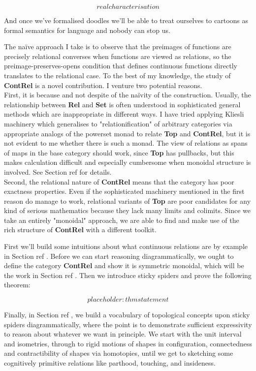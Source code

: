 \[real characterisation\]

And once we've formalised doodles we'll be able to treat ourselves to cartoons as formal semantics for language and nobody can stop us.


The na\"{i}ve approach I take is to observe that the preimages of functions are precisely relational converses when functions are viewed as relations, so the preimage-preserves-opens condition that defines continuous functions directly translates to the relational case. To the best of my knowledge, the study of \textbf{ContRel} is a novel contribution. I venture two potential reasons.\\

First, it is because and not despite of the na\"{i}vity of the construction. Usually, the relationship between \textbf{Rel} and \textbf{Set} is often understood in sophisticated general methods which are inappropriate in different ways. I have tried applying Kliesli machinery which generalises to "relationification" of arbitrary categories via appropriate analogs of the powerset monad to relate \textbf{Top} and \textbf{ContRel}, but it is not evident to me whether there is such a monad. The view of relations as spans of maps in the base category should work, since \textbf{Top} has pullbacks, but this makes calculation difficult and especially cumbersome when monoidal structure is involved. See Section \bR ref \e for details.\\

Second, the relational nature of \textbf{ContRel} means that the category has poor exactness properties. Even if the sophisticated machinery mentioned in the first reason do manage to work, relational variants of \textbf{Top} are poor candidates for any kind of serious mathematics because they lack many limits and colimits. Since we take an entirely "monoidal" approach, we are able to find and make use of the rich structure of \textbf{ContRel} with a different toolkit.

 First we'll build some intuitions about what continuous relations are by example in Section \bR ref \e. Before we can start reasoning diagrammatically, we ought to define the category \textbf{ContRel} and show it is symmetric monoidal, which will be the work in Section \bR ref \e. Then we introduce sticky spiders and prove the following theorem:

\begin{theorem}
\[placeholder: thm statement\]
\end{theorem}

Finally, in Section \bR ref \e, we build a vocabulary of topological concepts upon sticky spiders diagrammatically, where the point is to demonstrate sufficient expressivity to reason about whatever we want in principle. We start with the unit interval and isometries, through to rigid motions of shapes in configuration, connectedness and contractibility of shapes via homotopies, until we get to sketching some cognitively primitive relations like parthood, touching, and insideness.
